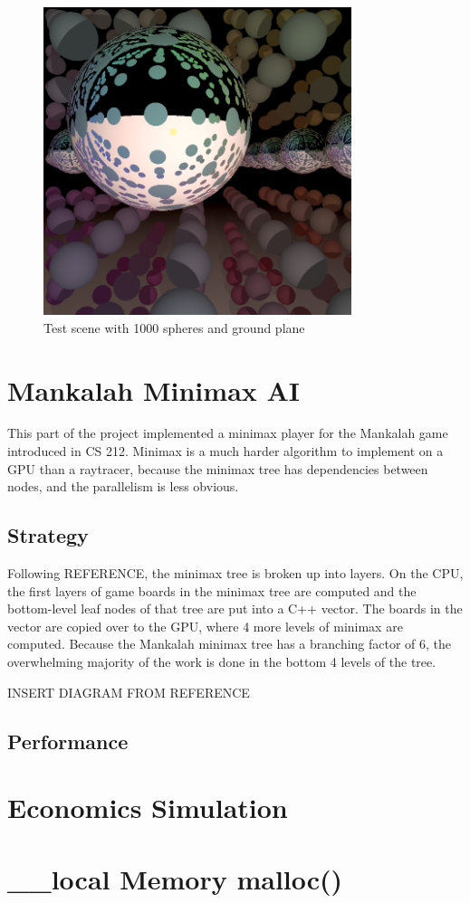 \documentclass{article}
\begin{document}
\begin{figure}[ht!]
\centering
\includegraphics[width=90mm]{reflections.png}
\caption{Test scene with 1000 spheres and ground plane}
\label{fig:testscene}
\end{figure}

\section{Mankalah Minimax AI}
This part of the project implemented a minimax player for the Mankalah game introduced in CS 212. Minimax is a much harder algorithm to implement on a GPU than a raytracer, because the minimax tree has dependencies between nodes, and the parallelism is less obvious.

\subsection{Strategy}
Following REFERENCE, the minimax tree is broken up into layers. On the CPU, the first layers of game boards in the minimax tree are computed and the bottom-level leaf nodes of that tree are put into a C++ vector. The boards in the vector are copied over to the GPU, where 4 more levels of minimax are computed. Because the Mankalah minimax tree has a branching factor of 6, the overwhelming majority of the work is done in the bottom 4 levels of the tree.

INSERT DIAGRAM FROM REFERENCE

\subsection{Performance}



\section{Economics Simulation}


\section{\_\_local Memory malloc()}
\end{document}
